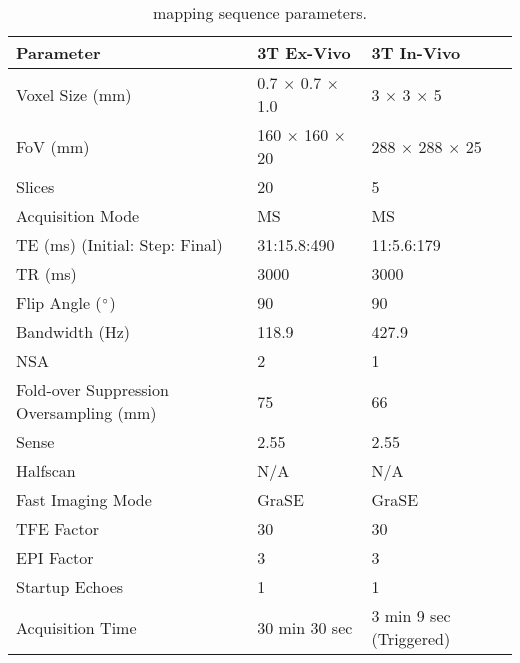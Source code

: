 \begin{table}[H]
	\centering
	\begin{tabularx}{1.0\textwidth}{X|X|X}
	\textbf{Parameter}                      & \textbf{3T Ex-Vivo} & \textbf{3T In-Vivo} \\ \hline
	Voxel Size (mm)                         & 0.7 $\times$ 0.7 $\times$ 1.0     & 3 $\times$ 3 $\times$ 5           \\ \hline
	FoV (mm)                                & 160 $\times$ 160 $\times$ 20      & 288 $\times$ 288 $\times$ 25      \\ \hline
	Slices                                  & 20                  & 5                   \\ \hline
	Acquisition Mode                        & MS                  & MS                  \\ \hline
	TE (ms) (Initial: Step: Final)          & 31:15.8:490         & 11:5.6:179          \\ \hline
	TR (ms)                                 & 3000                & 3000                \\ \hline
	Flip Angle ($\degree$)                  & 90                  & 90                  \\ \hline
	Bandwidth (Hz)                          & 118.9               & 427.9               \\ \hline
	NSA                                     & 2                   & 1                   \\ \hline
	Fold-over Suppression Oversampling (mm) & 75                  & 66                  \\ \hline
	Sense                                   & 2.55                & 2.55                \\ \hline
	Halfscan                                & N/A                 & N/A                 \\ \hline
	Fast Imaging Mode                       & GraSE               & GraSE               \\ \hline
	TFE Factor                              & 30                  & 30                  \\ \hline
	EPI Factor                              & 3                   & 3                   \\ \hline
	Startup Echoes                          & 1                   & 1                   \\ \hline
	Acquisition Time                        & 30 min 30 sec       & 3 min 9 sec (Triggered) 
	\end{tabularx}
	\caption{\ttwo mapping sequence parameters.}
	\label{tab:ex_t2_mapping}
\end{table}

